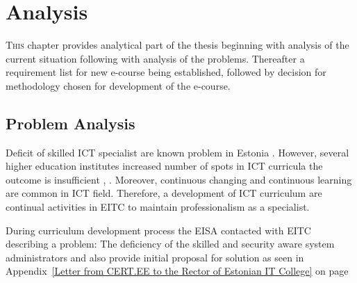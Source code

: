 \chapter{Analysis}
\label{analysis}

\lettrine[lraise=0.1, nindent=0em, slope=-.5em]{\color{Violet}T}{his} chapter provides analytical part of the thesis beginning with analysis of the current situation following with analysis of the problems. Thereafter a requirement list for new e-course being established, followed by decision for methodology chosen for development of the e-course. 

\section{Problem Analysis}
\label{Problem Analysis}


Deficit of skilled \gls{ICT} specialist are known problem in Estonia \citep{website:ict_puudu} \citep{website:ict_needs}. However, several higher education institutes increased number of spots in \gls{ICT} curricula the outcome is insufficient \citep{website:TU_ict}, \citep{website:itc_facts}. Moreover, continuous changing and continuous learning are common in \gls{ICT} field. Therefore, a development of \gls{ICT} curriculum are continual activities in \gls{EITC} to maintain professionalism as a specialist.

During curriculum development process the \gls{EISA} contacted with \gls{EITC} describing a problem: The deficiency of the skilled and security aware system administrators and also provide initial proposal for solution as seen in Appendix~\ref{Letter from CERT.EE to the Rector of Estonian IT College} on page ~\pageref{Letter from CERT.EE to the Rector of Estonian IT College}



